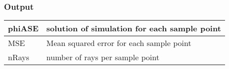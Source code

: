 \subsubsection{Output}
\begin{supertabular}{| p{3cm} | p{4cm} |}
  \hline
  phiASE & solution of simulation for each sample point \\\hline
  MSE & Mean squared error for each sample point \\\hline
  nRays & number of rays per sample point \\\hline
\end{supertabular}
